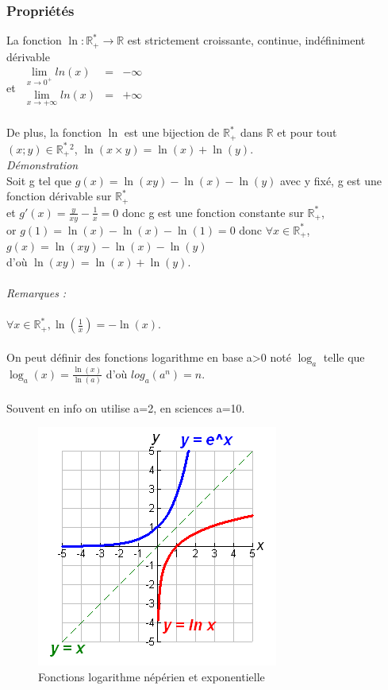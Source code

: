 \documentclass[a4paper,10pt]{book}
\newcommand{\R}{\mathbb{R}}
\newcommand{\Rpe}{\mathbb{R}_{+}^{*}}
\begin{document}
\subsubsection*{Propriétés} 
La fonction $\ln : \R _{+} ^{*} \longrightarrow \R$ est strictement croissante, continue, indéfiniment dérivable \\et 
\begin{math} \begin{array}{rcl}
\underset{x \rightarrow 0^{+}}{\lim} ln(x)&=& -\infty \\
\underset{x \rightarrow +\infty}{\lim} ln(x) &=& +\infty \\
\end{array} \end{math}

De plus, la fonction $\ln$ est une bijection de $ \Rpe $ dans $\R$ et pour tout $(x ; y) \in  \Rpe {}^{2}$, $\ln(x\times y)=\ln(x)+\ln(y)$.\\

\textit{Démonstration}\\
Soit g tel que $g(x)=\ln(xy)-\ln(x)-\ln(y)$ avec y fixé, g est une fonction dérivable sur $\Rpe$\\
et $g'(x)=\frac{y}{xy}-\frac{1}{x}=0$ donc g est une fonction constante sur $\Rpe$,\\
or $g(1)=\ln(x)-\ln(x)-\ln(1)=0$ donc $\forall x \in \Rpe$, $g(x)=\ln(xy)-\ln(x)-\ln(y)$\\
d'où $\ln(xy)=\ln(x)+\ln(y)$.
\paragraph*{}\emph{Remarques :}\\ \\
$\forall x \in \Rpe , \ln(\frac{1}{x})=-\ln(x)$.\\ \\
On peut définir des fonctions logarithme en base a>0 noté $\log_{a}$ telle que $\log_{a}(x)=\frac{\ln(x)}{\ln(a)}$ d'où $log_{a}(a^{n})=n$.\\ \\
Souvent en info on utilise a=2, en sciences a=10.

\begin{figure}[h]
\begin{center}
\includegraphics[scale=0.75]{images/003.png}
\caption{Fonctions logarithme népérien et exponentielle}
\end{center}
\end{figure}
\end{document}
